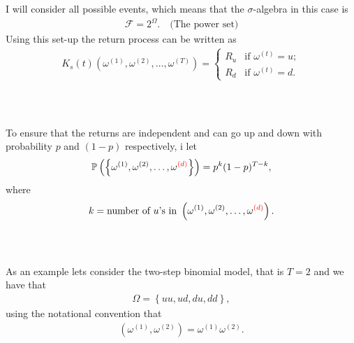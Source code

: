 \documentclass{beamer}
\numberwithin{equation}{section}
\begin{document}
\begin{frame}\frametitle{{\normalsize \secname} \\ {\large \subsecname}}
    I will consider all possible events, which means that the $\sigma$-algebra in this case is
    \begin{align}
        \mathscr{F} = 2^{\Omega}. \quad \text{(The power set)}
    \end{align}
    Using this set-up the return process can be written as
    \begin{align}
        K_s(t)(\omega^{(1)}, \omega^{(2)}, \ldots, \omega^{(T)}) =
        \begin{cases}
            R_u & \text{if } \omega^{(t)} = u; \\
            R_d & \text{if } \omega^{(t)} = d. 
        \end{cases}
    \end{align}
\end{frame}

\begin{frame}\frametitle{{\normalsize \secname} \\ {\large \subsecname}}
    To ensure that the returns are independent and can go up and down with probability $p$ and $(1-p)$ respectively, i let
    \begin{align}
        \mathbb{P}\left(
            \left\{
                \omega^{(1)}, \omega^{(2)}, \ldots, \omega^{{\color{red}(d)}}
            \right\}
        \right) =
        p^k(1 - p)^{T-k},
    \end{align}
    where
    \begin{align}
        k = \text{number of $u$'s in } \left(\omega^{(1)}, \omega^{(2)}, \ldots, \omega^{{\color{red}(d)}}\right). 
    \end{align} 
\end{frame}

\begin{frame}\frametitle{{\normalsize \secname} \\ {\large \subsecname}}
    As an example lets consider the two-step binomial model, that is $T = 2$ and we have that
    \begin{align}
        \Omega = \left\{ uu, ud, du, dd \right\},
    \end{align}
    using the notational convention that
    \begin{align}
        \left(
            \omega^{(1)}, \omega^{(2)}
        \right)
        =
        \omega^{(1)}\omega^{(2)}.
    \end{align}
\end{frame}
\end{document}
